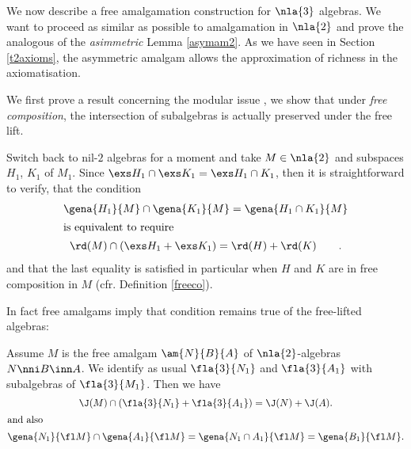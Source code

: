 We now describe a free amalgamation construction for $\nla{3}$ algebras. We want to proceed as similar as possible
to amalgamation in $\nla{2}$ and prove the analogous of the {\em asimmetric} Lemma \ref{asymam2}. As we have seen
in Section \ref{t2axioms}, the asymmetric amalgam allows the approximation of richness in the axiomatisation.

\medskip
We first prove a result concerning the modular issue , we show
that under {\em free composition}, the intersection of subalgebras is actually preserved under the free lift.

\smallskip
Switch back to nil-$2$ algebras for a moment and take $M\in\nla{2}$ and subspaces $H_{1}$, $K_{1}$
of $M_{1}$. Since $\exs H_{1}\cap\exs K_{1}=\exs H_{1}\cap K_{1}$, then it is straightforward to verify, that the condition
\begin{gather}
\gena{H_{1}}{M}\cap\gena{K_{1}}{M}=\gena{H_{1}\cap K_{1}}{M}\label{modulino}\\
\intertext{is equivalent to require}
\rd(M)\cap\left(\exs H_{1}+\exs K_{1}\right)=\rd(H)+\rd(K)\tag*{}.
\end{gather}
and that the last equality is satisfied in particular when $H$ and $K$ are in free composition in $M$ (cfr.{} Definition \ref{freeco}).

In fact free amalgams imply that condition  remains true of the free-lifted algebras:
\begin{lem}\label{moduliftlem}
Assume $M$ is the free amalgam $\am{N}{B}{A}$ of $\nla{2}$-algebras $N\nni B\inn A$.
We identify as usual $\fla{3}{N_{1}}$ and $\fla{3}{A_{1}}$ with subalgebras of
$\fla{3}{M_{1}}$. Then we have
\begin{gather}
\J(M)\cap(\fla{3}{N_{1}}+\fla{3}{A_{1}})=\J(N)+\J(A).\label{modujei}\\
\intertext{and also}
\gena{N_{1}}{\fl M}\cap\gena{A_{1}}{\fl M}=\gena{N_{1}\cap A_{1}}{\fl M}=\gena{B_{1}}{\fl M}\label{modulift}.
\end{gather}
\end{lem}

